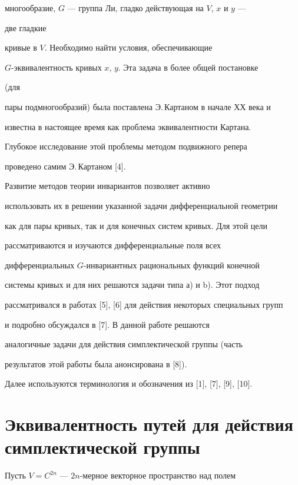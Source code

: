 многообразие, $G$ --- группа Ли, гладко действующая на $V$, $x$ и $y$ ---


две гладкие


кривые в $V$. Необходимо найти условия, обеспечивающие


$G$-эквивалентность кривых $x$, $y$. Эта задача в более общей постановке 


(для


пары подмногообразий) была поставлена Э.\,Картаном в начале ХХ века и 


известна в настоящее время как проблема эквивалентности Картана.


Глубокое исследование этой проблемы методом подвижного репера 


проведено самим Э.\,Картаном [4].





Развитие методов теории инвариантов позволяет активно 


использовать их в решении указанной задачи дифференциальной геометрии 


как для пары кривых, так и для конечных систем кривых. Для этой цели 


рассматриваются и изучаются дифференциальные поля всех 


дифференциальных $G$-инвариантных рациональных функций конечной 


системы кривых и для них решаются задачи типа а) и b). Этот подход 


рассматривался в работах [5], [6] для действия некоторых специальных групп 


и подробно обсуждался в [7]. В данной работе решаются 


аналогичные задачи для действия симплектической группы (часть 


результатов этой работы была анонсирована в [8]).





Далее используются терминология и обозначения из [1], [7], [9], [10].





\section{Эквивалентность путей для действия симплектической группы}





Пусть $V=C^{2n}$ --- $2n$-мерное векторное пространство над полем 


